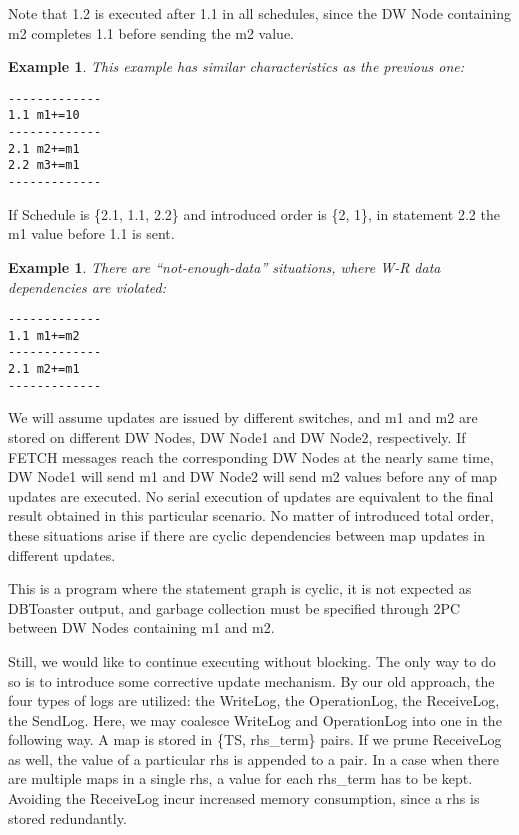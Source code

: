 \documentclass{sig-semester}
\newtheorem{example}[theorem]{Example}
\begin{document}
Note that 1.2 is executed after 1.1 in all schedules, since the DW Node containing m2 completes 1.1 before sending the m2 value.

\begin{example} \em
\label{ex:starter2}
This example has similar characteristics as the previous one:
\begin{verbatim}
-------------
1.1 m1+=10
-------------
2.1 m2+=m1
2.2 m3+=m1
-------------
\end{verbatim}
\end{example}
If Schedule is \{2.1, 1.1, 2.2\} and introduced order is \{2, 1\}, in statement 2.2 the m1 value before 1.1 is sent.

\begin{example} \em
\label{ex:atomicity}
There are ``not-enough-data'' situations, where W-R data dependencies are violated:
\begin{verbatim}
-------------
1.1 m1+=m2
-------------
2.1 m2+=m1
-------------
\end{verbatim}
\end{example}
We will assume updates are issued by different switches, and m1 and m2 are stored on different DW Nodes, DW Node1 and DW Node2, respectively. If FETCH messages reach the corresponding DW Nodes at the nearly same time, DW Node1 will send m1 and DW Node2 will send m2 values before any of map updates are executed. No serial execution of updates are equivalent to the final result obtained in this particular scenario. No matter of introduced total order, these situations arise if there are cyclic dependencies between map updates in different updates.

This is a program where the statement graph is cyclic, it is not expected as DBToaster output, and garbage collection must be specified through 2PC between DW Nodes containing m1 and m2.

Still, we would like to continue executing without blocking. The only way to do so is to introduce some corrective update mechanism. By our old approach, the four types of logs are utilized: the WriteLog, the OperationLog, the ReceiveLog, the SendLog. Here, we may coalesce WriteLog and OperationLog into one in the following way. A map is stored in \{TS, rhs\_term\} pairs. If we prune ReceiveLog as well, the value of a particular rhs is appended to a pair. In a case when there are multiple maps in a single rhs, a value for each rhs\_term has to be kept. Avoiding the ReceiveLog incur increased memory consumption, since a rhs is stored redundantly. 
\end{document}
